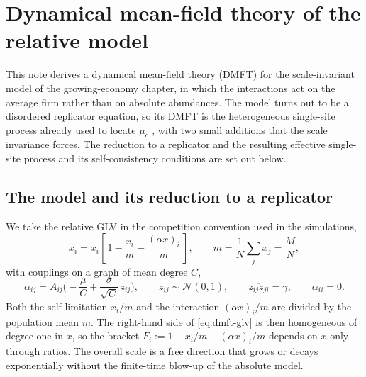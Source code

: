 \chapter{Dynamical mean-field theory of the relative model}
\label{app:dmft}
\providecommand{\Dz}{\mathcal{D}z}
\providecommand{\E}{\mathbb{E}}

This note derives a dynamical mean-field theory (DMFT) for the scale-invariant model of
the growing-economy chapter, in which the interactions act on the average firm rather
than on absolute abundances. The model turns out to be a disordered replicator equation,
so its DMFT is the heterogeneous single-site process already used to locate $\mu_c$
\citep{aguirrelopez}, with two small additions that the scale invariance forces. The
reduction to a replicator and the resulting effective single-site process and its
self-consistency conditions are set out below.

\section{The model and its reduction to a replicator}
\label{sec:dmft-model}

We take the relative GLV in the competition convention used in the simulations,
\begin{equation}
    \dot x_i = x_i\left[\,1 - \frac{x_i}{m} - \frac{(\alpha x)_i}{m}\,\right],
    \qquad m = \frac1N\sum_j x_j = \frac MN ,
    \label{eq:dmft-glv}
\end{equation}
with couplings on a graph of mean degree $C$,
\begin{equation}
    \alpha_{ij} = A_{ij}\Big(-\frac{\mu}{C} + \frac{\sigma}{\sqrt C}\,z_{ij}\Big),\qquad
    z_{ij}\sim\mathcal N(0,1),\qquad \overline{z_{ij}z_{ji}} = \gamma,\qquad \alpha_{ii}=0 .
\end{equation}
Both the self-limitation $x_i/m$ and the interaction $(\alpha x)_i/m$ are divided by the
population mean $m$. The right-hand side of \eqref{eq:dmft-glv} is then homogeneous of
degree one in $x$, so the bracket $F_i := 1 - x_i/m - (\alpha x)_i/m$ depends on $x$ only
through ratios. The overall scale is a free direction that grows or decays exponentially
without the finite-time blow-up of the absolute model.

